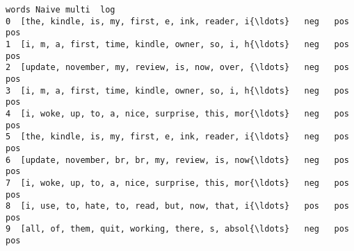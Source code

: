 \documentclass[11pt]{article}
\begin{document}
\begin{tcolorbox}[breakable, size=fbox, boxrule=.5pt, pad at break*=1mm, opacityfill=0]
\begin{Verbatim}[commandchars=\\\{\}]
                                               words Naive multi  log
0  [the, kindle, is, my, first, e, ink, reader, i{\ldots}   neg   pos  pos
1  [i, m, a, first, time, kindle, owner, so, i, h{\ldots}   neg   pos  pos
2  [update, november, my, review, is, now, over, {\ldots}   neg   pos  pos
3  [i, m, a, first, time, kindle, owner, so, i, h{\ldots}   neg   pos  pos
4  [i, woke, up, to, a, nice, surprise, this, mor{\ldots}   neg   pos  pos
5  [the, kindle, is, my, first, e, ink, reader, i{\ldots}   neg   pos  pos
6  [update, november, br, br, my, review, is, now{\ldots}   neg   pos  pos
7  [i, woke, up, to, a, nice, surprise, this, mor{\ldots}   neg   pos  pos
8  [i, use, to, hate, to, read, but, now, that, i{\ldots}   pos   pos  pos
9  [all, of, them, quit, working, there, s, absol{\ldots}   neg   pos  pos
\end{Verbatim}
\end{tcolorbox}
        
\end{document}
